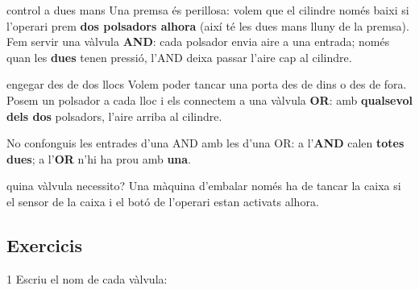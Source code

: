 \begin{exemple}{control a dues mans}
Una premsa és perillosa: volem que el cilindre només baixi si l'operari prem \textbf{dos polsadors alhora} (així té les dues mans lluny de la premsa). Fem servir una vàlvula \textbf{AND}: cada polsador envia aire a una entrada; només quan les \textbf{dues} tenen pressió, l'AND deixa passar l'aire cap al cilindre.
\end{exemple}

\begin{exemple}{engegar des de dos llocs}
Volem poder tancar una porta des de dins o des de fora. Posem un polsador a cada lloc i els connectem a una vàlvula \textbf{OR}: amb \textbf{qualsevol dels dos} polsadors, l'aire arriba al cilindre.
\end{exemple}

\begin{atencio}
No confonguis les entrades d'una AND amb les d'una OR: a l'\textbf{AND} calen \textbf{totes dues}; a l'\textbf{OR} n'hi ha prou amb \textbf{una}.
\end{atencio}

\begin{guiada}{quina vàlvula necessito?}
Una màquina d'embalar només ha de tancar la caixa si el sensor de la caixa i el botó de l'operari estan activats alhora.
\end{guiada}

\subsection*{Exercicis}

\begin{exercici}{1}
Escriu el nom de cada vàlvula:\\[0.3em]
\begin{center}
\hspace{2cm}\hspace{2cm}\hspace{2cm}
\end{center}
\end{exercici}

